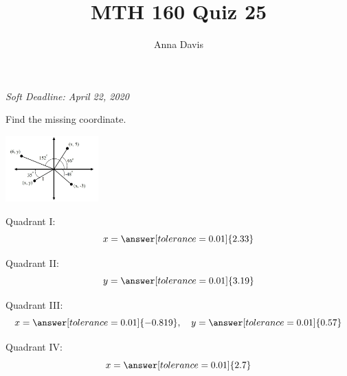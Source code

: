 \documentclass{ximera}
\author{Anna Davis} \title{MTH 160 Quiz 25}
\begin{document}
\begin{abstract}

\end{abstract}
\maketitle
 \textit{Soft Deadline: April 22, 2020}
\begin{problem}\label{prob:quiz25prob1}
Find the missing coordinate.
\begin{image}
   
\includegraphics[height=1in]{Inkedquiz25.jpg}~
 
\end{image}

Quadrant I:
$$x=\answer[tolerance=0.01]{2.33}$$

Quadrant II:
$$y=\answer[tolerance=0.01]{3.19}$$

Quadrant III:
$$x=\answer[tolerance=0.01]{-0.819},\quad y=\answer[tolerance=0.01]{0.57}$$

Quadrant IV:
$$x=\answer[tolerance=0.01]{2.7}$$

\end{problem}
\end{document}
